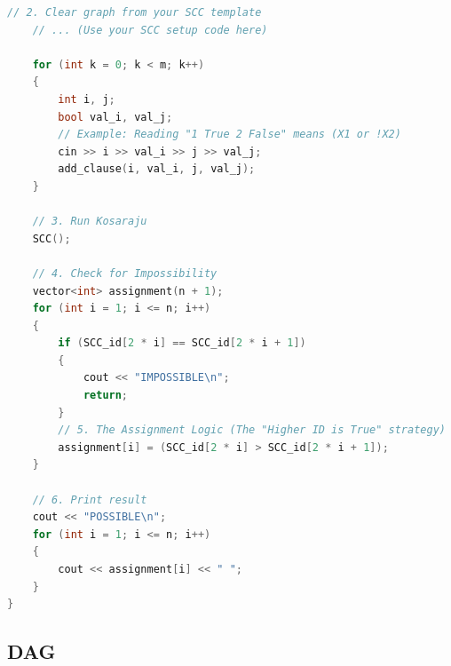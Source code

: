 \documentclass[10pt,landscape,a4paper,twocolumn]{article}
\begin{document}
\begin{lstlisting}[language=C++]
    // 2. Clear graph from your SCC template
    // ... (Use your SCC setup code here)

    for (int k = 0; k < m; k++)
    {
        int i, j;
        bool val_i, val_j;
        // Example: Reading "1 True 2 False" means (X1 or !X2)
        cin >> i >> val_i >> j >> val_j;
        add_clause(i, val_i, j, val_j);
    }

    // 3. Run Kosaraju
    SCC();

    // 4. Check for Impossibility
    vector<int> assignment(n + 1);
    for (int i = 1; i <= n; i++)
    {
        if (SCC_id[2 * i] == SCC_id[2 * i + 1])
        {
            cout << "IMPOSSIBLE\n";
            return;
        }
        // 5. The Assignment Logic (The "Higher ID is True" strategy)
        assignment[i] = (SCC_id[2 * i] > SCC_id[2 * i + 1]);
    }

    // 6. Print result
    cout << "POSSIBLE\n";
    for (int i = 1; i <= n; i++)
    {
        cout << assignment[i] << " ";
    }
}

\end{lstlisting}
\subsection{DAG}
\end{document}
